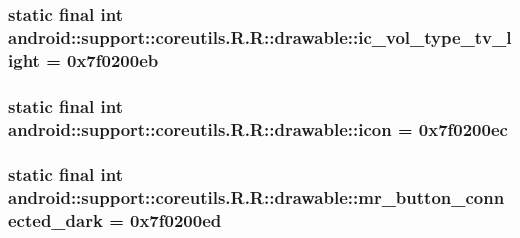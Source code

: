 \hypertarget{classandroid_1_1support_1_1coreutils_1_1_r_1_1drawable_f22373537066038150703d106d458ad0}{
\subsubsection[{ic\_\-vol\_\-type\_\-tv\_\-light}]{\setlength{\rightskip}{0pt plus 5cm}static final int android::support::coreutils.R.R::drawable::ic\_\-vol\_\-type\_\-tv\_\-light = 0x7f0200eb}}
\label{classandroid_1_1support_1_1coreutils_1_1_r_1_1drawable_f22373537066038150703d106d458ad0}


\hypertarget{classandroid_1_1support_1_1coreutils_1_1_r_1_1drawable_8b8901b72a7d7c6db0bb04cef67cfaa4}{
\subsubsection[{icon}]{\setlength{\rightskip}{0pt plus 5cm}static final int android::support::coreutils.R.R::drawable::icon = 0x7f0200ec}}
\label{classandroid_1_1support_1_1coreutils_1_1_r_1_1drawable_8b8901b72a7d7c6db0bb04cef67cfaa4}


\hypertarget{classandroid_1_1support_1_1coreutils_1_1_r_1_1drawable_74a1e64468717789f9a9355995d67047}{
\subsubsection[{mr\_\-button\_\-connected\_\-dark}]{\setlength{\rightskip}{0pt plus 5cm}static final int android::support::coreutils.R.R::drawable::mr\_\-button\_\-connected\_\-dark = 0x7f0200ed}}
\label{classandroid_1_1support_1_1coreutils_1_1_r_1_1drawable_74a1e64468717789f9a9355995d67047}



